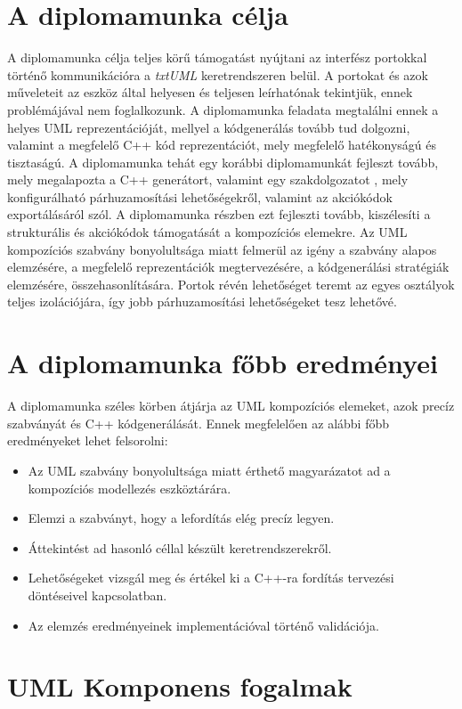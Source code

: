 \documentclass[a4paper,12pt]{report}
\begin{document}
\section{A diplomamunka célja}
A diplomamunka célja teljes körű támogatást nyújtani az interfész portokkal történő kommunikációra a \textit{txtUML} keretrendszeren belül. A portokat és azok műveleteit az eszköz által helyesen és teljesen leírhatónak tekintjük, ennek problémájával nem foglalkozunk. A diplomamunka feladata megtalálni ennek a helyes UML reprezentációját, mellyel a kódgenerálás tovább tud dolgozni, valamint a megfelelő C++ kód reprezentációt, mely megfelelő hatékonyságú és tisztaságú. A diplomamunka tehát egy korábbi diplomamunkát fejleszt tovább\cite{hack_dip}, mely megalapozta a C++ generátort, valamint egy szakdolgozatot \cite{my_szakdolg}, mely konfigurálható párhuzamosítási lehetőségekről, valamint az akciókódok exportálásáról szól. A diplomamunka részben ezt fejleszti tovább, kiszélesíti a strukturális és akciókódok támogatását a kompozíciós elemekre. Az UML kompozíciós szabvány bonyolultsága miatt felmerül az igény a szabvány alapos elemzésére, a megfelelő reprezentációk megtervezésére, a kódgenerálási stratégiák elemzésére, összehasonlítására. Portok révén lehetőséget teremt az egyes osztályok teljes izolációjára, így jobb párhuzamosítási lehetőségeket tesz lehetővé.

\section{A diplomamunka főbb eredményei}
A diplomamunka széles körben átjárja az UML kompozíciós elemeket, azok precíz szabványát és C++ kódgenerálását. Ennek megfelelően az alábbi főbb eredményeket lehet felsorolni:
\begin{itemize}
\item Az UML szabvány bonyolultsága miatt érthető magyarázatot ad a kompozíciós modellezés eszköztárára.
\item Elemzi a szabványt, hogy a lefordítás elég precíz legyen.
\item Áttekintést ad hasonló céllal készült keretrendszerekről.
\item Lehetőségeket vizsgál meg és értékel ki a C++-ra fordítás tervezési döntéseivel kapcsolatban.
\item Az elemzés eredményeinek implementációval történő validációja.
\end{itemize}

\section{UML Komponens fogalmak}
\end{document}
